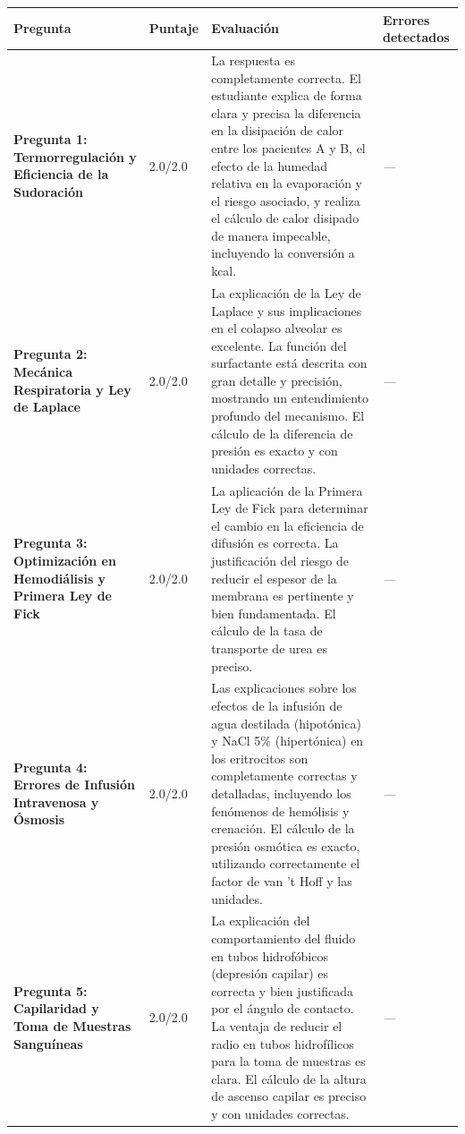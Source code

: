 \documentclass[11pt,a4paper]{article}
\begin{document}
\begin{longtable}{>{\bfseries}p{2.8cm} p{1.6cm} p{7.0cm} p{2.8cm}}
  \toprule
  \textbf{Pregunta} & \textbf{Puntaje} & \textbf{Evaluación} & \textbf{Errores detectados} \\
  \midrule
  \endhead
  \bottomrule
  \endfoot
    \textbf{Pregunta 1: Termorregulación y Eficiencia de la Sudoración} & 2.0/2.0 & La respuesta es completamente correcta. El estudiante explica de forma clara y precisa la diferencia en la disipación de calor entre los pacientes A y B, el efecto de la humedad relativa en la evaporación y el riesgo asociado, y realiza el cálculo de calor disipado de manera impecable, incluyendo la conversión a kcal. & \textit{---} \\
    \midrule
    \textbf{Pregunta 2: Mecánica Respiratoria y Ley de Laplace} & 2.0/2.0 & La explicación de la Ley de Laplace y sus implicaciones en el colapso alveolar es excelente. La función del surfactante está descrita con gran detalle y precisión, mostrando un entendimiento profundo del mecanismo. El cálculo de la diferencia de presión es exacto y con unidades correctas. & \textit{---} \\
    \midrule
    \textbf{Pregunta 3: Optimización en Hemodiálisis y Primera Ley de Fick} & 2.0/2.0 & La aplicación de la Primera Ley de Fick para determinar el cambio en la eficiencia de difusión es correcta. La justificación del riesgo de reducir el espesor de la membrana es pertinente y bien fundamentada. El cálculo de la tasa de transporte de urea es preciso. & \textit{---} \\
    \midrule
    \textbf{Pregunta 4: Errores de Infusión Intravenosa y Ósmosis} & 2.0/2.0 & Las explicaciones sobre los efectos de la infusión de agua destilada (hipotónica) y NaCl 5\% (hipertónica) en los eritrocitos son completamente correctas y detalladas, incluyendo los fenómenos de hemólisis y crenación. El cálculo de la presión osmótica es exacto, utilizando correctamente el factor de van 't Hoff y las unidades. & \textit{---} \\
    \midrule
    \textbf{Pregunta 5: Capilaridad y Toma de Muestras Sanguíneas} & 2.0/2.0 & La explicación del comportamiento del fluido en tubos hidrofóbicos (depresión capilar) es correcta y bien justificada por el ángulo de contacto. La ventaja de reducir el radio en tubos hidrofílicos para la toma de muestras es clara. El cálculo de la altura de ascenso capilar es preciso y con unidades correctas. & \textit{---} \\
    \midrule
\end{longtable}
\end{document}
